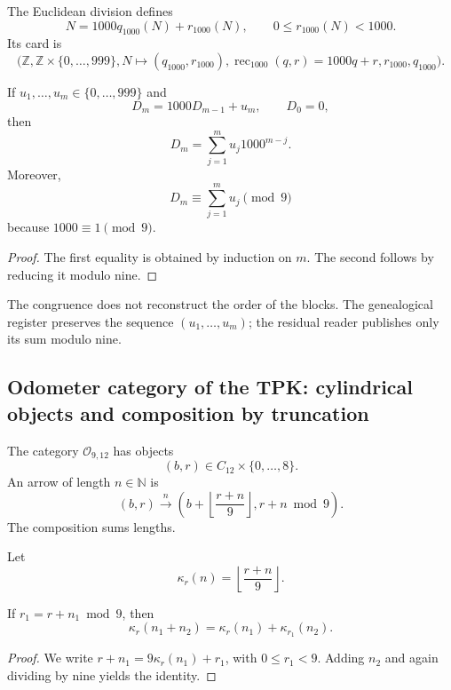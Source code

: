 The Euclidean division defines
\[
 N=1000q_{1000}(N)+r_{1000}(N),
 \qquad 0\leq r_{1000}(N)<1000.
\]
Its card is
\[
 \bigl(
 \mathbb Z,\mathbb Z\times\{0,\ldots,999\},
 N\mapsto(q_{1000},r_{1000}),
 \operatorname{rec}_{1000}(q,r)=1000q+r,
 r_{1000},
 q_{1000}
 \bigr).
\]

\begin{proposition}
\label{p12-83-c1-s13:prop:tpk-concatenacion-base-mil}
If \(u_1,\ldots,u_m\in\{0,\ldots,999\}\) and
\[
 D_m=1000D_{m-1}+u_m,
 \qquad D_0=0,
\]
then
\[
 D_m=\sum_{j=1}^m u_j1000^{m-j}.
\]
Moreover,
\[
 D_m\equiv\sum_{j=1}^m u_j\pmod9
\]
because \(1000\equiv1\pmod9\).
\end{proposition}

\begin{proof}
The first equality is obtained by induction on \(m\). The second follows
by reducing it modulo nine.
\end{proof}

The congruence does not reconstruct the order of the blocks. The genealogical register preserves the sequence \((u_1,\ldots,u_m)\); the residual reader publishes only its sum modulo nine.

\subsection{Odometer category of the TPK: cylindrical objects and composition by truncation}

\begin{definition}
\label{p12-83-c1-s13:def:tpk-odometro-9-12}
The category \(\mathcal O_{9,12}\) has objects
\[
 (b,r)\in C_{12}\times\{0,\ldots,8\}.
\]
An arrow of length \(n\in\mathbb N\) is
\[
 (b,r)\xrightarrow{\ n\ }
 \left(
  b+\left\lfloor\frac{r+n}{9}\right\rfloor,
  r+n\bmod9
 \right).
\]
The composition sums lengths.
\end{definition}

Let
\[
 \kappa_r(n)=\left\lfloor\frac{r+n}{9}\right\rfloor.
\]

\begin{lemma}
\label{p12-83-c1-s13:lem:tpk-cociclo-odometro}
If \(r_1=r+n_1\bmod9\), then
\[
 \kappa_r(n_1+n_2)
 =\kappa_r(n_1)+\kappa_{r_1}(n_2).
\]
\end{lemma}

\begin{proof}
We write \(r+n_1=9\kappa_r(n_1)+r_1\), with
\(0\leq r_1<9\). Adding \(n_2\) and again dividing by nine
yields the identity.
\end{proof}


